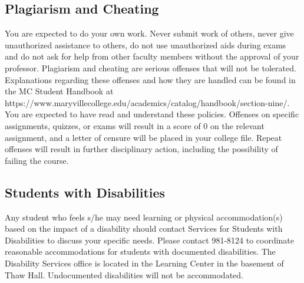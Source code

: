 \documentclass[11pt]{article}
\begin{document}
\subsection*{Plagiarism and Cheating}
You are expected to do your own work. Never submit work of others,
never give unauthorized assistance to others, do not use unauthorized aids during exams and do not ask for help from other
faculty members without the approval of your professor. Plagiarism and cheating are serious offenses that will not be
tolerated. Explanations regarding these offenses and how they are handled can be found in the MC Student Handbook at\newline
https://www.maryvillecollege.edu/academics/catalog/handbook/section-nine/.\newline
You are expected to have read and understand these policies. Offenses on specific assignments, quizzes, or exams will result
in a score of 0 on the relevant assignment, and a letter of censure will be placed in your college file. Repeat offenses will
result in further disciplinary action, including the possibility of failing the course.

\subsection*{Students with Disabilities}
Any student who feels s/he may need learning or physical
accommodation(s) based on the impact of a disability should contact Services for Students with Disabilities to discuss your
specific needs. Please contact 981-8124 to coordinate reasonable accommodations for students with documented
disabilities. The Disability Services office is located in the Learning Center in the basement of Thaw Hall. Undocumented
disabilities will not be accommodated.
\end{document}
